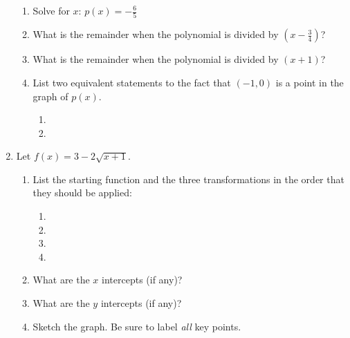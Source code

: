 \documentclass[letterpaper,12pt,fleqn]{article}
\begin{document}
\begin{enumerate}
  \begin{enumerate}
  \item Solve for $x$: $p(x)=-\frac{6}{5}$

    \vspace{1in}
    
  \item What is the remainder when the polynomial is divided by
    $\left(x-\frac{3}{4}\right)$?

    \vspace{1in}
    
  \item What is the remainder when the polynomial is divided by $(x+1)$?

    \vspace{1in}
    
  \item List two equivalent statements to the fact that $(-1,0)$ is a point
    in the graph of $p(x)$.
    \begin{enumerate}
    \item
    \item
    \end{enumerate}
  \end{enumerate}

  \newpage

\item Let $f(x)=3-2\sqrt{x+1}$.
  \begin{enumerate}
  \item List the starting function and the three transformations in the order
    that they should be applied:
    \begin{enumerate}
      \item
      \item
      \item
      \item
    \end{enumerate}
  \item What are the $x$ intercepts (if any)?

    \vspace{2in}
    
  \item What are the $y$ intercepts (if any)?

    \vspace{1in}
    
  \item Sketch the graph. Be sure to label \emph{all} key points.

    \bigskip


\end{enumerate}
\end{enumerate}
\end{document}
